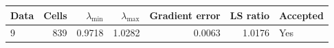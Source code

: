 \begin{tabular}{lr|rrrr|l}
\toprule
Data & Cells & $\lambda_{\min}$ & $\lambda_{\max}$ & Gradient error & LS ratio & Accepted \\
\midrule
9 & 839 & 0.9718 & 1.0282 & 0.0063 & 1.0176 & Yes \\
\bottomrule
\end{tabular}
